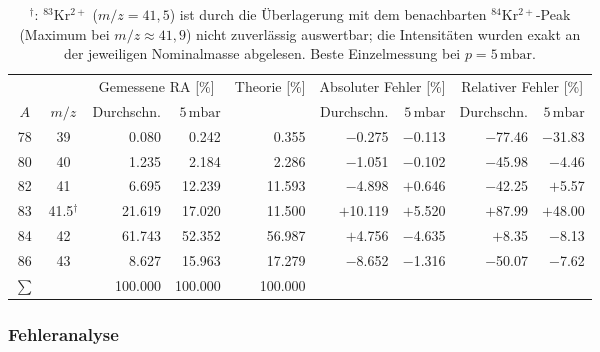 \documentclass{article}
\begin{document}
\begin{table}[htbp]
    \centering
    \caption{$^\dagger$: $^{83}$Kr$^{2+}$ ($m/z=41{,}5$) ist durch die Überlagerung mit dem
benachbarten $^{84}$Kr$^{2+}$-Peak (Maximum bei $m/z\approx 41{,}9$) nicht
zuverlässig auswertbar; die Intensitäten wurden exakt an der jeweiligen
Nominalmasse abgelesen. Beste Einzelmessung bei $p = 5\,\mathrm{mbar}$.}
    \label{tab:kr2}
    \begin{adjustbox}{max width=\textwidth}
    \begin{tabular}{c c r r r r r r r}
        \toprule
        & & \multicolumn{2}{c}{Gemessene RA [\%]}
        & {Theorie [\%]}
        & \multicolumn{2}{c}{Absoluter Fehler [\%]}
        & \multicolumn{2}{c}{Relativer Fehler [\%]} \\
        \cmidrule(lr){3-4}\cmidrule(lr){6-7}\cmidrule(lr){8-9}
        $A$ & $m/z$
        & Durchschn. & $5\,\mathrm{mbar}$
        &
        & Durchschn. & $5\,\mathrm{mbar}$
        & Durchschn. & $5\,\mathrm{mbar}$ \\
        \midrule
        78 & 39             &  0.080 &  0.242 &  0.355 &  $-$0.275 & $-$0.113 & $-$77.46 & $-$31.83 \\
        80 & 40             &  1.235 &  2.184 &  2.286 &  $-$1.051 & $-$0.102 & $-$45.98 &  $-$4.46 \\
        82 & 41             &  6.695 & 12.239 & 11.593 &  $-$4.898 & $+$0.646 & $-$42.25 &  $+$5.57 \\
        83 & 41.5$^\dagger$ & 21.619 & 17.020 & 11.500 & $+$10.119 & $+$5.520 & $+$87.99 & $+$48.00 \\
        84 & 42             & 61.743 & 52.352 & 56.987 &  $+$4.756 & $-$4.635 &  $+$8.35 &  $-$8.13 \\
        86 & 43             &  8.627 & 15.963 & 17.279 &  $-$8.652 & $-$1.316 & $-$50.07 &  $-$7.62 \\
        \midrule
        $\sum$ & & 100.000 & 100.000 & 100.000 & & & & \\
        \bottomrule
    \end{tabular}
    \end{adjustbox}
\end{table}



\subsubsection*{Fehleranalyse}
\end{document}
